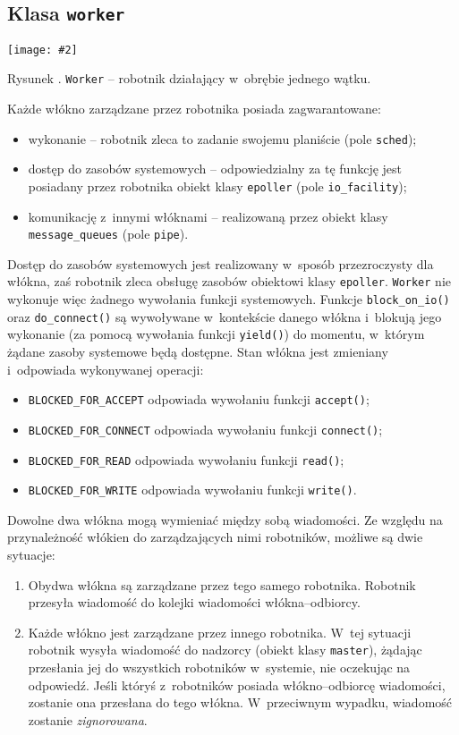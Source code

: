 \documentclass[12pt]{mwart}
\newcommand{\code}{\texttt}
\newcommand{\procbr}{()}
\newcommand{\function}[1]{\code{#1\procbr}}
\newcounter{figmain}
\newcommand{\myownfigure}[4]{ \newcounter{#1} \setcounter{#1}{\value{figmain}} \addtocounter{figmain}{1} \begin{center} \label{fig:#1} \centering \texttt{[image: \#2]}\\ \nopagebreak[5] \parbox[t]{11.5cm}{Rysunek \arabic{#1}. #3.} \end{center}}
\begin{document}
\subsection{Klasa \code{worker}}
\myownfigure{Worker}{Worker.png}{\code{Worker} -- robotnik działający w~obrębie jednego wątku}{.7}
\indent
  Każde włókno zarządzane przez robotnika posiada zagwarantowane:
  \begin{itemize}
    \item wykonanie -- robotnik zleca to zadanie swojemu planiście (pole \code{sched});
    \item dostęp do zasobów systemowych -- odpowiedzialny za tę funkcję jest posiadany przez robotnika obiekt klasy \code{epoller} (pole \code{io\_facility});
    \item komunikację z~innymi włóknami -- realizowaną przez obiekt klasy \linebreak \code{message\_queues} (pole \code{pipe}).
  \end{itemize}
\par
\indent
  Dostęp do zasobów systemowych  jest realizowany w~sposób przezroczysty dla włókna, zaś robotnik zleca obsługę zasobów obiektowi klasy \code{epoller}.
  \code{Worker} nie wykonuje więc żadnego wywołania funkcji systemowych.
  Funkcje \function{block\_on\_io} oraz \function{do\_connect} są wywoływane w~kontekście danego włókna i~blokują jego wykonanie (za pomocą wywołania funkcji \function{yield}) do momentu, w~którym 
  żądane zasoby systemowe będą dostępne. Stan włókna jest zmieniany i~odpowiada wykonywanej operacji:
  \begin{itemize}
    \item \code{BLOCKED\_FOR\_ACCEPT} odpowiada wywołaniu funkcji \function{accept};
    \item \code{BLOCKED\_FOR\_CONNECT} odpowiada wywołaniu funkcji \function{connect};
    \item \code{BLOCKED\_FOR\_READ} odpowiada wywołaniu funkcji \function{read};
    \item \code{BLOCKED\_FOR\_WRITE} odpowiada wywołaniu funkcji \function{write}.
  \end{itemize}
\par
\indent
  Dowolne dwa włókna mogą wymieniać między sobą wiadomości. Ze względu na przynależność włókien do zarządzających nimi robotników, możliwe są dwie sytuacje:
  \begin{enumerate}
    \item Obydwa włókna są zarządzane przez tego samego robotnika. Robotnik przesyła wiadomość do kolejki wiadomości włókna--odbiorcy.
    \item Każde włókno jest zarządzane przez innego robotnika. W~tej sytuacji robotnik wysyła wiadomość do nadzorcy (obiekt klasy \code{master}), żądając
      przesłania jej do wszystkich robotników w~systemie, nie oczekując na odpowiedź. Jeśli któryś z~robotników posiada włókno--odbiorcę wiadomości, zostanie ona
      przesłana do tego włókna. W~przeciwnym wypadku, wiadomość zostanie \emph{zignorowana}.
  \end{enumerate}
\end{document}
